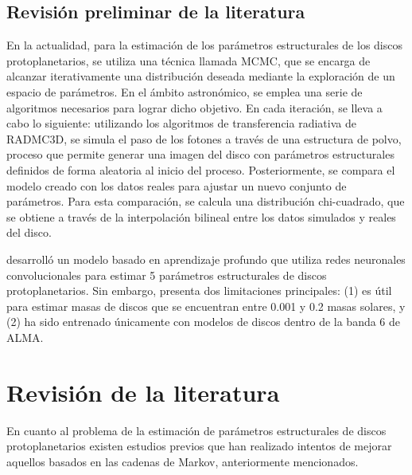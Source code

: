 \subsection{Revisión preliminar de la literatura}


En la actualidad, para la estimación de los parámetros estructurales de los discos protoplanetarios, se utiliza una técnica llamada MCMC, que se encarga de alcanzar iterativamente una distribución deseada mediante la exploración de un espacio de parámetros. En el ámbito astronómico, se emplea una serie de algoritmos necesarios para lograr dicho objetivo. En cada iteración, se lleva a cabo lo siguiente: utilizando los algoritmos de transferencia radiativa de RADMC3D, se simula el paso de los fotones a través de una estructura de polvo, proceso que permite generar una imagen del disco con parámetros estructurales definidos de forma aleatoria al inicio del proceso. Posteriormente, se compara el modelo creado con los datos reales para ajustar un nuevo conjunto de parámetros. Para esta comparación, se calcula una distribución chi-cuadrado, que se obtiene a través de la interpolación bilineal entre los datos simulados y reales del disco.

\cite{diaz2023} desarrolló un modelo basado en aprendizaje profundo que utiliza redes neuronales convolucionales para estimar 5 parámetros estructurales de discos protoplanetarios. Sin embargo, presenta dos limitaciones principales: (1) es útil para estimar masas de discos que se encuentran entre 0.001 y 0.2 masas solares, y (2) ha sido entrenado únicamente con modelos de discos dentro de la banda 6 de ALMA. 



\section{Revisión de la literatura}

En cuanto al problema de la estimación de parámetros estructurales de discos protoplanetarios existen estudios previos que han realizado intentos de mejorar aquellos basados en las cadenas de Markov, anteriormente mencionados.

